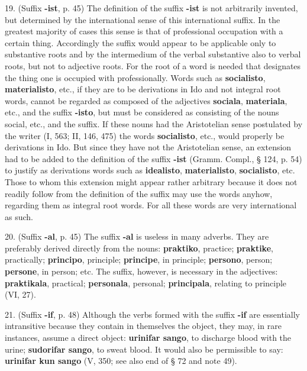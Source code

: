 19. (Suffix \textbf{-ist}, p. 45) The definition of the suffix \textbf{-ist} is not arbitrarily invented, but determined by the international sense of this international suffix. In the greatest majority of cases this sense is that of professional occupation with a certain thing. Accordingly the suffix would appear to be applicable only to substantive roots and by the intermedium of the verbal substantive also to verbal roots, but not to adjective roots. For the root of a word is needed that designates the thing one is occupied with professionally. Words such as \textbf{socialisto}, \textbf{materialisto}, etc., if they are to be derivations in Ido and not integral root words, cannot be regarded as composed of the adjectives \textbf{sociala}, \textbf{materiala}, etc., and the suffix \textbf{-isto}, but must be considered as consisting of the nouns social, etc., and the suffix. If these nouns had the Aristotelian sense postulated by the writer (I, 563; II, 146, 475) the words \textbf{socialisto}, etc., would properly be derivations in Ido. But since they have not the Aristotelian sense, an extension had to be added to the definition of the suffix \textbf{-ist} (Gramm. Compl., § 124, p. 54) to justify as derivations words such as \textbf{idealisto}, \textbf{materialisto}, \textbf{socialisto}, etc. Those to whom this extension might appear rather arbitrary because it does not readily follow from the definition of the suffix may use the words anyhow, regarding them as integral root words. For all these words are very international as such.

20. (Suffix \textbf{-al}, p. 45) The suffix \textbf{-al} is useless in many adverbs. They are preferably derived directly from the nouns: \textbf{praktiko}, practice; \textbf{praktike}, practically; \textbf{principo}, principle; \textbf{principe}, in principle; \textbf{persono}, person; \textbf{persone}, in person; etc. The suffix, however, is necessary in the adjectives: \textbf{praktikala}, practical; \textbf{personala}, personal; \textbf{principala}, relating to principle (VI, 27). %

21. (Suffix \textbf{-if}, p. 48) Although the verbs formed with the suffix \textbf{-if} are essentially intransitive because they contain in themselves the object, they may, in rare instances, assume a direct object: \textbf{urinifar sango}, to discharge blood with the urine; \textbf{sudorifar sango}, to sweat blood. It would also be permissible to say: \textbf{urinifar kun sango} (V, 350; see also end of § 72 and note 49). %

